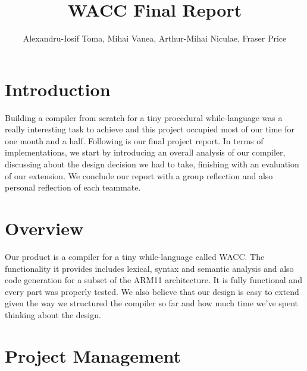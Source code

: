 \documentclass[11pt]{article}
\begin{document}
\title{WACC Final Report}
\author{
	Alexandru-Iosif Toma,
    Mihai Vanea,
	Arthur-Mihai Niculae,
    Fraser Price
}
\maketitle

\section{Introduction}
Building a compiler from scratch for a tiny procedural while-language was a really interesting task to achieve and this project occupied most of our time for one month and a half. Following is our final project report. In terms of implementations, we start by introducing an overall analysis of our compiler, discussing about the design decision we had to take, finishing with an evaluation of our extension. We conclude our report with a group reflection and also personal reflection of each teammate.

\section{Overview}
\iffalse
THE PRODUCT(1/4)
1. An analysis and critical evaluation of the quality of the WACC compiler
2. It meets the functional specification?
3. Judge that it forms a sound basis for future development
4. May wish to address performance issues.
\fi
Our product is a compiler for a tiny while-language called WACC. The functionality it provides includes lexical, syntax and semantic analysis and also code generation for a subset of the ARM11 architecture. It is fully functional and every part was properly tested. We also believe that our design is easy to extend given the way we structured the compiler so far and how much time we've spent thinking about the design.

\section{Project Management}

\iffalse
THE PROJECT MANAGEMENT(2/4):
1. Analysis of the organisation of your group
2. Use of project management tools (such as Git)
3. How your group was structured
4. How you coordinated your work and detail any tools that helped/hindered your progress
5. What went well and what you would do differently if you were to do the lab again
\fi
\end{document}
